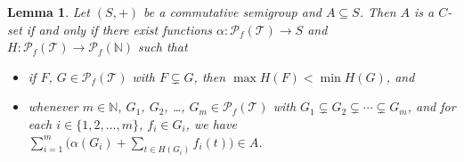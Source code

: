 \documentclass[12pt,showtrims]{memoir}
\theoremstyle{plain}
\newtheorem{lem}[thm]{Lemma}
\theoremstyle{definition}
\newcommand{\bbN}{\mathbb{N}}
\newcommand{\calT}{\mathcal{T}}
\newcommand{\Pf}{\mathcal{P}_f}
\begin{document}
\begin{lem}
  Let $(S, +)$ be a commutative semigroup and $A \subseteq S$.
  Then $A$ is a $C$-set if and only if there exist functions $\alpha \colon \Pf(\calT) \to S$ and $H \colon \Pf(\calT) \to \Pf(\bbN)$ such that
  \begin{itemize}
    \item[(1)] if $F$, $G \in \Pf(\calT)$ with $F \subsetneq G$, then $\max H(F) < \min H(G)$, and
    
    \item[(2)] whenever $m \in \bbN$, $G_1$, $G_2$, \dots, $G_m \in \Pf(\calT)$ with $G_1 \subsetneq G_2 \subsetneq \cdots \subsetneq G_m$, and for each $i \in \{1, 2, \ldots, m\}$, $f_i \in G_i$, we have $\sum_{i=1}^m\bigl( \alpha(G_i) + \sum_{t \in H(G_i)} f_i(t)\bigr) \in A$.
  \end{itemize}
\end{lem}
\end{document}

